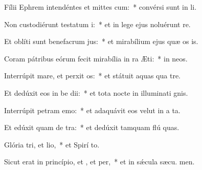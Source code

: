 \item Fílii Ephrem intendéntes et mittes cum:~* convérsi sunt in  li.
\item Non custodiérunt testatum i:~* et in lege ejus noluérunt re.
\item Et oblíti sunt benefacrum jus:~* et mirabílium ejus quæ os is.
\item Coram pátribus eórum fecit mirabília in ra Æti:~* in  neos.
\item Interrúpit mare, et perxit os:~* et státuit aquas qua  tre.
\item Et dedúxit eos in be dii:~* et tota nocte in illuminati gnis.
\item Interrúpit petram  emo:~* et adaquávit eos velut in a ta.
\item Et edúxit quam de tra:~* et dedúxit tamquam flú quas.
\item Glória tri, et lio,~* et Spirí to.
\item Sicut erat in princípio, et , et per,~* et in sǽcula sæcu. men.
